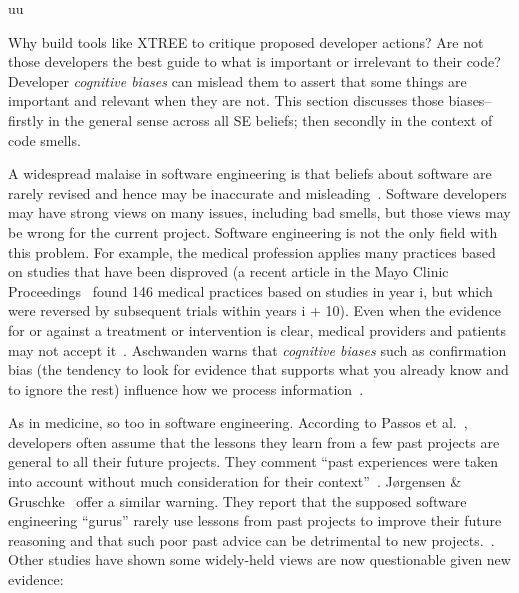 uu \documentclass[final,twocolumn,5p]{elsarticle}
\theoremstyle{break}
\begin{document}
Why build tools like XTREE to  critique proposed developer actions?
Are not those developers the best guide to what is important or irrelevant
to their code? Developer {\em cognitive biases} can mislead them to
assert that some things are important and relevant when they are not.
This section discusses those biases-- firstly in the general sense
across all SE beliefs; then secondly in the   context of code smells.

A widespread malaise in software engineering is that
beliefs about software are rarely revised and hence may be
  inaccurate and 
misleading~\cite{passos11,jorgensen09,mei15,me16phase,prem16}. Software developers may have strong views on many issues, including bad smells, but those views may be wrong for the current
project.
Software engineering is not the only field with this problem.
  For example, the medical profession applies many practices based on studies that have been disproved (a recent article in the Mayo Clinic Proceedings~\cite{prasad13} found 146 medical practices based on studies in year i, but which were reversed by subsequent trials within years i + 10). Even when the evidence for or against a treatment or intervention is clear, medical providers and patients may not accept it~\cite{aschwanden10}. Aschwanden warns that {\em cognitive biases} such as confirmation bias (the tendency to look for evidence that supports what you already know and to ignore the rest) influence how we process information~\cite{aschwanden15}.

As in medicine, so too in software engineering.
According to Passos et al.~\cite{passos11},  developers often  assume that the lessons they learn from a few past projects are general to all their future projects. They comment ``past experiences were taken into account without much consideration for their context''~\cite{passos11}.  J{\o}rgensen \& Gruschke~\cite{jorgensen09} offer a similar warning. They report that the supposed software engineering ``gurus'' rarely use lessons from past projects to improve their future reasoning and that such poor past advice can be detrimental to new projects.~\cite{jorgensen09}. Other studies have shown some widely-held views are   now questionable given new evidence:
\end{document}
